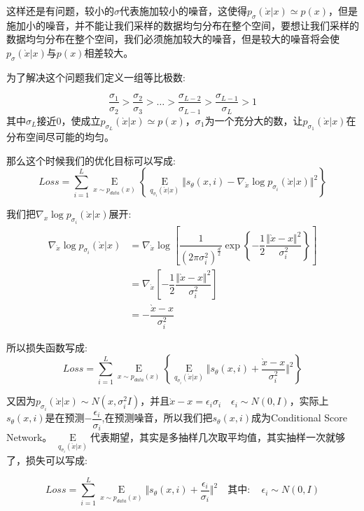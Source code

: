 \documentclass[withoutpreface,bwprint]{cumcmthesis} %
\begin{document}
	这样还是有问题，较小的$\sigma$代表施加较小的噪音，这使得$p_{\sigma}(\grave{x}|x) \simeq p(x)$，但是施加小的噪音，并不能让我们采样的数据均匀分布在整个空间，要想让我们采样的数据均匀分布在整个空间，我们必须施加较大的噪音，但是较大的噪音将会使$p_{\sigma}(\grave{x}|x)$与$p(x)$相差较大。
	
	为了解决这个问题我们定义一组等比极数:
	
	$$\dfrac{\sigma_1}{\sigma_2} > \dfrac{\sigma_2}{\sigma_3} > \ldots > \dfrac{\sigma_{L-2}}{\sigma_{L-1}} > \dfrac{\sigma_{L-1}}{\sigma_{L}} > 1$$
	其中$\sigma_L$接近$0$，使成立$p_{\sigma_L}(\grave{x}|x) \simeq p(x)$，$\sigma_{1}$为一个充分大的数，让$p_{\sigma_1}(\grave{x}|x)$在分布空间尽可能的均匀。
	
	那么这个时候我们的优化目标可以写成:
	$$
		Loss =   \sum_{i=1}^{L}\mathop{E}\limits_{ x \sim p_{data}(x) } \left\{  \mathop{E}\limits_{ q_{\sigma_{i}}(\grave{x}|x) }\Vert s_{\theta}(x,i) - \nabla_{\grave{x}} \log p_{\sigma_i}(\grave{x}|x) \Vert^2 \right\}
	$$
	
	我们把$\nabla_{x} \log p_{\sigma_i}(\grave{x}|x)$展开:
	\begin{align*}
			\nabla_{\grave{x}} \log p_{\sigma_i}(\grave{x}|x) & = \nabla_{\grave{x}} \log \left[ \dfrac{1}{\left( 2\pi \sigma_{i}^2\right)^\frac{d}{2}} \exp \left\{ -\dfrac{1}{2} \dfrac{\Vert \grave{x} -x\Vert^2}{\sigma_{i}^2}\right\} \right] \\
			& = \nabla_{\grave{x}} \left[ -\dfrac{1}{2} \dfrac{\Vert \grave{x} -x\Vert^2}{\sigma_{i}^2} \right] \\
			& =  -\dfrac{\grave{x}-x}{\sigma_{i}^2} 
	\end{align*}
	
	所以损失函数写成:
	$$
		Loss =   \sum_{i=1}^{L}\mathop{E}\limits_{ x \sim p_{data}(x) } \left\{  \mathop{E}\limits_{ q_{\sigma_{i}}(\grave{x}|x) }\Vert s_{\theta}(x,i) + \dfrac{\grave{x}-x}{\sigma_{i}^2}  \Vert^2 \right\}
	$$
		
		又因为$p_{\sigma_i}(\grave{x}|x) \sim N(x,\sigma_i^2 I)$，并且$\grave{x} - x = \epsilon_i \sigma_{i} \quad \epsilon_i \sim N(0,I)$，实际上$ s_{\theta}(x,i)$是在预测$-\dfrac{\epsilon_i}{\sigma_{i}}$,在预测噪音，所以我们把$s_{\theta}(x,i)$成为Conditional Score Network。
	$\mathop{E}\limits_{ q_{\sigma_{i}}(\grave{x}|x) }$代表期望，其实是多抽样几次取平均值，其实抽样一次就够了，损失可以写成:
	
	$$
	Loss =   \sum_{i=1}^{L}\mathop{E}\limits_{ x \sim p_{data}(x) }  \Vert s_{\theta}(x,i) + \dfrac{\epsilon_i}{\sigma_{i}}  \Vert^2  \quad \textbf{其中}: \quad \epsilon_i \sim N(0,I) 
	$$
	
\end{document}
